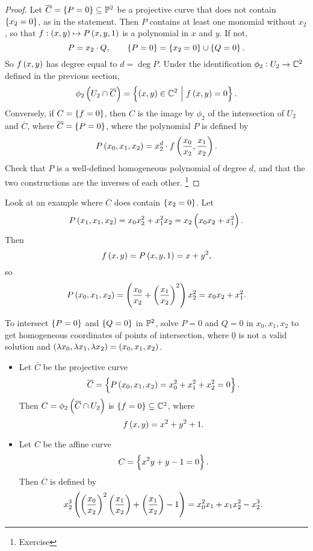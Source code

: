 \begin{proof}
Let $ \overline{C} = \cbr{P = 0} \subseteq \PP^2 $ be a projective curve that does not contain $ \cbr{x_2 = 0} $, as in the statement. Then $ P $ contains at least one monomial without $ x_2 $, so that $ f : \br{x, y} \mapsto P\br{x, y, 1} $ is a polynomial in $ x $ and $ y $. If not,
$$ P = x_2 \cdot Q, \qquad \cbr{P = 0} = \cbr{x_2 = 0} \cup \cbr{Q = 0}. $$
So $ f\br{x, y} $ has degree equal to $ d = \deg P $. Under the identification $ \phi_2 : U_2 \to \mathbb{C}^2 $ defined in the previous section,
$$ \phi_2\br{U_2 \cap \overline{C}} = \cbr{\br{x, y} \in \CC^2 \st f\br{x, y} = 0}. $$
Conversely, if $ C = \cbr{f = 0} $, then $ C $ is the image by $ \phi_2 $ of the intersection of $ U_2 $ and $ \overline{C} $, where $ \overline{C} = \cbr{P = 0} $, where the polynomial $ P $ is defined by
$$ P\br{x_0, x_1, x_2} = x_2^d \cdot f\br{\dfrac{x_0}{x_2}, \dfrac{x_1}{x_2}}. $$
Check that $ P $ is a well-defined homogeneous polynomial of degree $ d $, and that the two constructions are the inverses of each other. \footnote{Exercise}
\end{proof}

\pagebreak

\begin{example*}
Look at an example where $ \overline{C} $ does contain $ \cbr{x_2 = 0} $. Let
$$ P\br{x_1, x_1, x_2} = x_0x_2^2 + x_1^2x_2 = x_2\br{x_0x_2 + x_1^2}. $$
Then
$$ f\br{x, y} = P\br{x, y, 1} = x + y^2, $$
so
$$ P\br{x_0, x_1, x_2} = \br{\dfrac{x_0}{x_2} + \br{\dfrac{x_1}{x_2}}^2}x_2^2 = x_0x_2 + x_1^2. $$
\end{example*}

\begin{remark*}
To intersect $ \cbr{P = 0} $ and $ \cbr{Q = 0} $ in $ \mathbb{P}^2 $, solve $ P = 0 $ and $ Q = 0 $ in $ x_0, x_1, x_2 $ to get homogeneous coordinates of points of intersection, where $ \underline{0} $ is not a valid solution and $ \br{\lambda x_0, \lambda x_1, \lambda x_2} = \br{x_0, x_1, x_2} $.
\end{remark*}

\begin{example}
\hfill
\begin{itemize}
\item Let $ \overline{C} $ be the projective curve
$$ \overline{C} = \cbr{P\br{x_0, x_1, x_2} = x_0^2 + x_1^2 + x_2^2 = 0}. $$
Then $ C = \phi_2\br{\overline{C} \cap U_2} $ is $ \cbr{f = 0} \subseteq \CC^2 $, where
$$ f\br{x, y} = x^2 + y^2 + 1. $$
\item Let $ C $ be the affine curve
$$ C = \cbr{x^2y + y - 1 = 0}. $$
Then $ \overline{C} $ is defined by
$$ x_2^3\br{\br{\dfrac{x_0}{x_2}}^2\br{\dfrac{x_1}{x_2}} + \br{\dfrac{x_1}{x_2}} - 1} = x_0^2x_1 + x_1x_2^2 - x_2^3. $$
\end{itemize}
\end{example}

